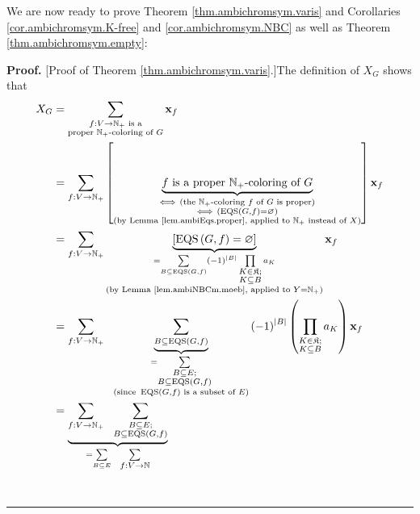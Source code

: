 \documentclass[numbers=enddot,12pt,final,onecolumn,notitlepage]{scrartcl}%
\theoremstyle{definition}
\newenvironment{proof}[1][Proof]{\noindent\textbf{#1.} }{\ \rule{0.5em}{0.5em}}
\newenvironment{vershort}{}{}
\let\sumnonlimits\sum
\let\prodnonlimits\prod
\renewcommand{\sum}{\sumnonlimits\limits}
\renewcommand{\prod}{\prodnonlimits\limits}
\begin{document}
We are now ready to prove Theorem \ref{thm.ambichromsym.varis} and Corollaries
\ref{cor.ambichromsym.K-free} and \ref{cor.ambichromsym.NBC} as well as
Theorem \ref{thm.ambichromsym.empty}:

\begin{vershort}
\begin{proof}
[Proof of Theorem \ref{thm.ambichromsym.varis}.]The definition of $X_{G}$
shows that
\begin{align*}
X_{G}  &  =\sum_{\substack{f:V\rightarrow\mathbb{N}_{+}\text{ is
a}\\\text{proper }\mathbb{N}_{+}\text{-coloring of }G}}\mathbf{x}_{f}\\
&  =\sum_{f:V\rightarrow\mathbb{N}_{+}}\left[  \underbrace{f\text{ is a proper
}\mathbb{N}_{+}\text{-coloring of }G}_{\substack{\Longleftrightarrow\ \left(
\text{the }\mathbb{N}_{+}\text{-coloring }f\text{ of }G\text{ is
proper}\right)  \\\Longleftrightarrow\ \left(  \operatorname*{EQS}\left(
G,f\right)  =\varnothing\right)  \\\text{(by Lemma \ref{lem.ambiEqs.proper},
applied to }\mathbb{N}_{+}\text{ instead of }X\text{)}}}\right]
\mathbf{x}_{f}\\
&  =\sum_{f:V\rightarrow\mathbb{N}_{+}}\underbrace{\left[  \operatorname*{EQS}%
\left(  G,f\right)  =\varnothing\right]  }_{\substack{=\sum_{B\subseteq
\operatorname*{EQS}\left(  G,f\right)  }\left(  -1\right)  ^{\left\vert
B\right\vert }\prod_{\substack{K\in\mathfrak{K};\\K\subseteq B}}a_{K}%
\\\text{(by Lemma \ref{lem.ambiNBCm.moeb}, applied to }Y=\mathbb{N}%
_{+}\text{)}}}\mathbf{x}_{f}\\
&  =\sum_{f:V\rightarrow\mathbb{N}_{+}}\ \ \underbrace{\sum_{B\subseteq
\operatorname*{EQS}\left(  G,f\right)  }}_{\substack{=\sum
_{\substack{B\subseteq E;\\B\subseteq\operatorname*{EQS}\left(  G,f\right)
}}\\\text{(since }\operatorname*{EQS}\left(  G,f\right)  \text{ is a subset of
}E\text{)}}}\left(  -1\right)  ^{\left\vert B\right\vert }\left(
\prod_{\substack{K\in\mathfrak{K};\\K\subseteq B}}a_{K}\right)  \mathbf{x}%
_{f}\\
&  =\underbrace{\sum_{f:V\rightarrow\mathbb{N}_{+}}\ \ \sum
_{\substack{B\subseteq E;\\B\subseteq\operatorname*{EQS}\left(  G,f\right)
}}}_{=\sum_{B\subseteq E}\ \ \sum_{\substack{f:V\rightarrow\mathbb{N}%
}}}
\end{align*}
\end{proof}
\end{vershort}
\end{document}
